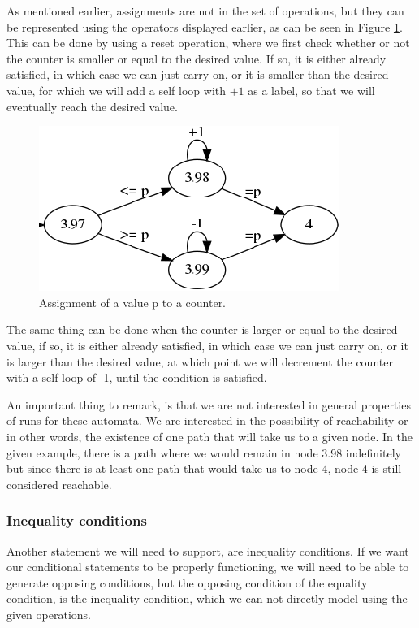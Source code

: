 \documentclass[12pt]{article}
\begin{document}
As mentioned earlier, assignments are not in the set of operations, but they can be represented using the operators displayed earlier, as can be seen in Figure \ref{fig:counter_assignment}. This can be done by using a reset operation, where we first check whether or not the counter is smaller or equal to the desired value. If so, it is either already satisfied, in which case we can just carry on, or it is smaller than the desired value, for which we will add a self loop with $+1$ as a label, so that we will eventually reach the desired value. 
\begin{figure}[h]
	\centering
	\includegraphics[width=0.48\linewidth]{counter_assignment}
	\caption{Assignment of a value p to a counter.}
	\label{fig:counter_assignment}
\end{figure}

The same thing can be done when the counter is larger or equal to the desired value, if so, it is either already satisfied, in which case we can just carry on, or it is larger than the desired value, at which point we will decrement the counter with a self loop of -1, until the condition is satisfied.

An important thing to remark, is that we are not interested in general properties of runs for these automata. We are interested in the possibility of reachability or in other words, the existence of one path that will take us to a given node. In the given example, there is a path where we would remain in node 3.98 indefinitely but since there is at least one path that would take us to node 4, node 4 is still considered reachable.

\subsubsection{Inequality conditions}
\label{sec:inequality}
Another statement we will need to support, are inequality conditions. If we want our conditional statements to be properly functioning, we will need to be able to generate opposing conditions, but the opposing condition of the equality condition, is the inequality condition, which we can not directly model using the given operations.
\end{document}
